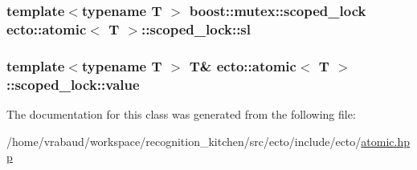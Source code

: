 \subsubsection[{\texorpdfstring{sl}{sl}}]{\setlength{\rightskip}{0pt plus 5cm}template$<$typename T $>$ boost\+::mutex\+::scoped\+\_\+lock {\bf ecto\+::atomic}$<$ T $>$\+::scoped\+\_\+lock\+::sl\hspace{0.3cm}{\ttfamily [private]}}\hypertarget{classecto_1_1atomic_1_1scoped__lock_a637b9c7c8246e2ac352cb03fa9f4b229}{}\label{classecto_1_1atomic_1_1scoped__lock_a637b9c7c8246e2ac352cb03fa9f4b229}
\subsubsection[{\texorpdfstring{value}{value}}]{\setlength{\rightskip}{0pt plus 5cm}template$<$typename T $>$ T\& {\bf ecto\+::atomic}$<$ T $>$\+::scoped\+\_\+lock\+::value}\hypertarget{classecto_1_1atomic_1_1scoped__lock_a89aa811b27815c91f99b3673a7f76753}{}\label{classecto_1_1atomic_1_1scoped__lock_a89aa811b27815c91f99b3673a7f76753}


The documentation for this class was generated from the following file\+:\begin{DoxyCompactItemize}
\item 
/home/vrabaud/workspace/recognition\+\_\+kitchen/src/ecto/include/ecto/\hyperlink{atomic_8hpp}{atomic.\+hpp}\end{DoxyCompactItemize}
